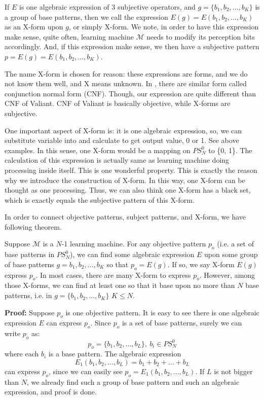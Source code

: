 \begin{definition}
If $E$ is one algebraic expression of 3 subjective operators, and $g = \{b_1, b_2, \ldots, b_K\}$ is a group of base patterns, then we call the expression $E(g) = E(b_1, b_2, \ldots, b_K)$ as an X-form upon $g$, or simply X-form. We note, in order to have this expression make sense, quite often, learning machine $\mathcal{M}$ needs to modify its perception bits accordingly. And, if this expression make sense, we then have a subjective pattern $p = E(g) =  E(b_1, b_2, \ldots, b_K)$.
\end{definition}
The name X-form is chosen for reason: these expressions are forms, and we do not know them well, and X means unknown. In \cite{valiant}, there are similar form called conjunction normal form (CNF). Though, our expression are quite different than CNF of Valiant. CNF of Valiant is basically objective, while X-forms are subjective. 

One important aspect of X-form is: it is one algebraic expression, so, we can substitute variable into and calculate to get output value, 0 or 1. See above examples. In this sense, one X-form would be a mapping on $PS_N^0$ to \{0, 1\}. The calculation of this expression is actually same as learning machine doing processing inside itself. This is one wonderful property. This is exactly the reason why we introduce the construction of X-form. In this way, one X-form can be thought as one processing. Thus, we can also think one X-form has a black set, which is exactly equals the subjective pattern of this X-form.   

In order to connect objective patterns, subject patterns, and X-form, we have following theorem.



\begin{theorem}
Suppose $\mathcal{M}$ is a $N$-1 learning machine. For any objective pattern $p_o$ (i.e. a set of base patterns in $PS_N^0$),  we can find some algebraic expression $E$ upon some group of base patterns $g = {b_1, b_2, \ldots, b_K}$ so that $p_o = E(g)$. If so, we say X-form $E(g)$ express $p_o$. In most cases, there are many X-form to express $p_o$. However, among those X-forms, we can find at least one so that it base upon no more than $N$ base patterns, i.e. in $g = \{b_1, b_2, \ldots, b_K\}$ $K \le N$. 
\end{theorem}
{\bf Proof:} Suppose $p_o$ is one objective pattern. It is easy to see there is one algebraic expression $E$ can express $p_o$. Since $p_o$ is a set of base patterns, surely we can write $p_o$ as:
$$
p_o = \{b_1, b_2, \ldots, b_L \}, \ b_i \in PS_N^0
$$ 
where each $b_i$ is a base pattern. The algebraic expression
\[
E_1(b_1, b_2, \ldots, b_L) = b_1 + b_2 + \ldots + b_L   \label{eq:ex1} \tag{1}
\]
can express $p_o$, since we can easily see $p_o = E_1(b_1, b_2, \ldots, b_L)$. If $L$ is not bigger than $N$, we already find such a group of base pattern and such an algebraic expression, and proof is done. 

